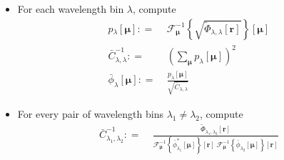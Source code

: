\documentclass[DM,authoryear,toc]{lsstdoc}
\begin{document}
\begin{itemize}
\item For each wavelength bin $\lambda$, compute
    \begin{align}
        p{_\lambda}[\bm{\mu}]
        \mathrel{\mathop:}= &\;
        \mathcal{F}_{\bm{\mu}}^{-1}\!\left\{
            \sqrt{\widetilde{\Phi}_{\lambda,\lambda}[\bm{r}]}
        \right\}\![
            \bm{\mu}
        ]
        \\
        \bar{C}^{-1}_{\lambda,\lambda}
        \mathrel{\mathop:}= &\;
        \left(\sum_{\bm{\mu}} p_{\lambda}[\bm{\mu}]\right)^2
        \\
        \bar{\phi}_{\lambda}[\bm{\mu}]
        \mathrel{\mathop:}= &\;
        \frac{p_{\lambda}[\bm{\mu}]}{\sqrt{\bar{C}_{\lambda,\lambda}}}
        \label{eqn:solution-diagonal-psfs}
    \end{align}
\item For every pair of wavelength bins $\lambda_1 \ne \lambda_2$, compute
    \begin{align}
        \bar{C}^{-1}_{\lambda_1,\lambda_2}
        \mathrel{\mathop:}= &\;
        \frac{
            \widetilde{\Phi}_{\lambda_1,\lambda_2}[\bm{r}]
        }{
            \mathcal{F}_{\bm{\mu}}^{-1}\!\left\{
                \bar{\phi}^*_{\lambda_1}[\bm{\mu}]
            \right\}\![\bm{r}]
            \;
            \mathcal{F}_{\bm{\mu}}^{-1}\!\left\{
                \bar{\phi}_{\lambda_2}[\bm{\mu}]
            \right\}\![\bm{r}]
        }
        \label{eqn:solution-offdiagonal-covariances}
    \end{align}
\end{itemize}
\end{document}
